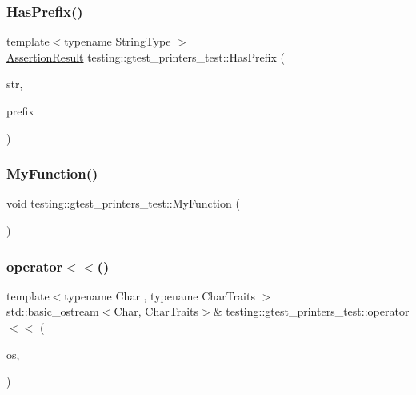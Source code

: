 \subsubsection{\texorpdfstring{Has\+Prefix()}{HasPrefix()}}
{\footnotesize\ttfamily template$<$typename String\+Type $>$ \\
\hyperlink{classtesting_1_1_assertion_result}{Assertion\+Result} testing\+::gtest\+\_\+printers\+\_\+test\+::\+Has\+Prefix (\begin{DoxyParamCaption}\item[{const String\+Type \&}]{str,  }\item[{const String\+Type \&}]{prefix }\end{DoxyParamCaption})}

\mbox{\label{namespacetesting_1_1gtest__printers__test_adf0e590d6776ecb7095a989ff2272d7b}} 
\subsubsection{\texorpdfstring{My\+Function()}{MyFunction()}}
{\footnotesize\ttfamily void testing\+::gtest\+\_\+printers\+\_\+test\+::\+My\+Function (\begin{DoxyParamCaption}\item[{int}]{ }\end{DoxyParamCaption})}

\mbox{\label{namespacetesting_1_1gtest__printers__test_a1eb0213095e639d357692066e8505887}} 
\subsubsection{\texorpdfstring{operator$<$$<$()}{operator<<()}\hspace{0.1cm}{\footnotesize\ttfamily [1/3]}}
{\footnotesize\ttfamily template$<$typename Char , typename Char\+Traits $>$ \\
std\+::basic\+\_\+ostream$<$Char, Char\+Traits$>$\& testing\+::gtest\+\_\+printers\+\_\+test\+::operator$<$$<$ (\begin{DoxyParamCaption}\item[{std\+::basic\+\_\+ostream$<$ Char, Char\+Traits $>$ \&}]{os,  }\item[{const \hyperlink{classtesting_1_1gtest__printers__test_1_1_allows_generic_streaming}{Allows\+Generic\+Streaming} \&}]{ }\end{DoxyParamCaption})}

